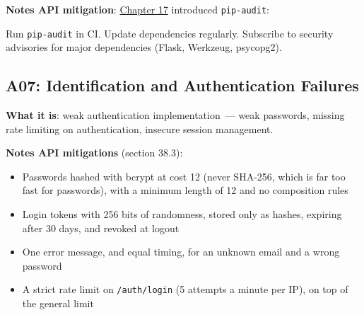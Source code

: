 \textbf{Notes API mitigation}: \hyperref[ch:17-build-process]{Chapter 17} introduced \texttt{pip-audit}:

\begin{codebox}[short]

\begin{Shaded}
\begin{Highlighting}[]

\CommentTok{\# {-}{-}{-}{-}{-}{-}{-}{-} {-}{-}{-}{-}{-}{-}{-} {-}{-}{-}{-}{-}{-}{-}{-}{-}{-}{-}{-}{-}{-}{-}{-}{-}{-}{-} {-}{-}{-}{-}{-}{-}{-}{-}{-}{-}{-}{-}}
\end{Highlighting}
\end{Shaded}

\end{codebox}

\noindent{}Run \texttt{pip-audit} in CI. Update dependencies regularly. Subscribe to security advisories for major dependencies (Flask, Werkzeug, psycopg2).

\subsection*{A07: Identification and Authentication Failures}\label{38-security:a07-identification-and-authentication-failures}

\textbf{What it is}: weak authentication implementation~--- weak passwords, missing rate limiting on authentication, insecure session management.

\textbf{Notes API mitigations} (section 38.3):

\begin{itemize}
\tightlist
\item
  Passwords hashed with bcrypt at cost 12 (never SHA-256, which is far too fast for passwords), with a minimum length of 12 and no composition rules
\item
  Login tokens with 256 bits of randomness, stored only as hashes, expiring after 30 days, and revoked at logout
\item
  One error message, and equal timing, for an unknown email and a wrong password
\item
  A strict rate limit on \texttt{/auth/login} (5 attempts a minute per IP), on top of the general limit
\end{itemize}

